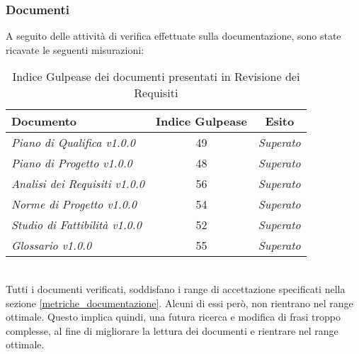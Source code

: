 \subsubsection{Documenti}
\label{docRR}
A seguito delle attività di verifica effettuate sulla documentazione, sono state ricavate le seguenti misurazioni:
\begin{table}[!h]
\begin{center}
		\begin{tabular}{|p{5cm}|c|c|}
			\hline
			\textbf{Documento} &
			\textbf{Indice Gulpease} &
			\textbf{Esito}\\ \hline
			\textit{Piano di Qualifica v1.0.0} & 49 &  \textit{\color{green}Superato} \\ 
			\textit{Piano di Progetto v1.0.0} & 48 & \textit{\color{green}Superato} \\ 
			\textit{Analisi dei Requisiti v1.0.0} & 56 & \textit{\color{green}Superato} \\ 
			\textit{Norme di Progetto v1.0.0} & 54 & \textit{\color{green}Superato} \\ 
			\textit{Studio di Fattibilità v1.0.0} & 52 & \textit{\color{green}Superato} \\ 
			\textit{Glossario v1.0.0} & 55 & \textit{\color{green}Superato} \\ 
			\hline
		\end{tabular}
		\caption{Indice Gulpease dei documenti presentati in Revisione dei Requisiti}
\end{center}
\end{table}
\\Tutti i documenti verificati, soddisfano i range di accettazione specificati nella sezione \ref{metriche_documentazione}. Alcuni di essi però, non rientrano nel range ottimale. Questo implica quindi, una futura ricerca e modifica di frasi troppo complesse, al fine di migliorare la lettura dei documenti e rientrare nel range ottimale.
\pagebreak
